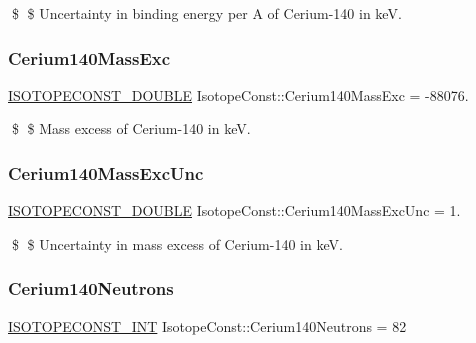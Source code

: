 \$ \$ Uncertainty in binding energy per A of Cerium-\/140 in keV. \mbox{\label{group___isotope_const-_cerium-_ce140_ga92ab640e69e851c6f4945b898701487a}} 
\subsubsection{\texorpdfstring{Cerium140\+Mass\+Exc}{Cerium140MassExc}}
{\footnotesize\ttfamily \mbox{\hyperlink{group___isotope_const-_macros_ga8f45a7272ce02c0b4c65c44636ed719a}{I\+S\+O\+T\+O\+P\+E\+C\+O\+N\+S\+T\+\_\+\+D\+O\+U\+B\+LE}} Isotope\+Const\+::\+Cerium140\+Mass\+Exc = -\/88076.}

\$ \$ Mass excess of Cerium-\/140 in keV. \mbox{\label{group___isotope_const-_cerium-_ce140_ga0d616694f069ec643803ba40307250ab}} 
\subsubsection{\texorpdfstring{Cerium140\+Mass\+Exc\+Unc}{Cerium140MassExcUnc}}
{\footnotesize\ttfamily \mbox{\hyperlink{group___isotope_const-_macros_ga8f45a7272ce02c0b4c65c44636ed719a}{I\+S\+O\+T\+O\+P\+E\+C\+O\+N\+S\+T\+\_\+\+D\+O\+U\+B\+LE}} Isotope\+Const\+::\+Cerium140\+Mass\+Exc\+Unc = 1.}

\$ \$ Uncertainty in mass excess of Cerium-\/140 in keV. \mbox{\label{group___isotope_const-_cerium-_ce140_gaee6e8863ff6ec744ca0d33e7f0d38d61}} 
\subsubsection{\texorpdfstring{Cerium140\+Neutrons}{Cerium140Neutrons}}
{\footnotesize\ttfamily \mbox{\hyperlink{group___isotope_const-_macros_ga5f18360b3e99483a35c32d789e62621c}{I\+S\+O\+T\+O\+P\+E\+C\+O\+N\+S\+T\+\_\+\+I\+NT}} Isotope\+Const\+::\+Cerium140\+Neutrons = 82}

